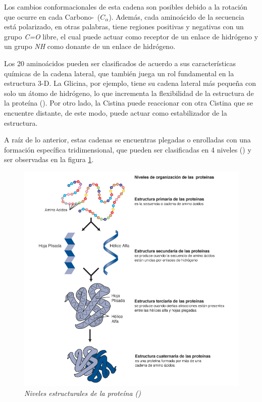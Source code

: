 Los cambios conformacionales de esta cadena son posibles debido a la rotación que ocurre en cada Carbono-\textalpha~($C_{\alpha}$). Además, cada aminoácido de la secuencia está polarizado, en otras palabras, tiene regiones positivas y negativas con un grupo \textit{C=O} libre, el cual puede actuar como receptor de un enlace de hidrógeno y un grupo \textit{NH} como donante de un enlace de hidrógeno.

Los 20 aminoácidos pueden ser clasificados de acuerdo a sus características químicas de la cadena lateral, que también juega un rol fundamental en la estructura 3-D. La Glicina, por ejemplo, tiene su cadena lateral más pequeña con solo un átomo de hidrógeno, lo que incrementa la flexibilidad de la estructura de la proteína (\citealp{Uzman:2001}). Por otro lado, la Cistina puede reaccionar con otra Cistina que se encuentre distante, de este modo, puede actuar como estabilizador de la estructura.

A raíz de lo anterior, estas cadenas se encuentras plegadas o enrolladas con una formación específica tridimensional, que pueden ser clasificadas en 4 niveles (\citealp{joao:1997}) y ser observadas en la figura \ref{fig:structures-protein}.

\begin{figure}
	\centering
	\includegraphics[scale=.6]{images/protein_lg.jpg}
	\caption{\em Niveles estructurales de la proteína (\citealp{image:genome-project})}
	\label{fig:structures-protein}
\end{figure}

